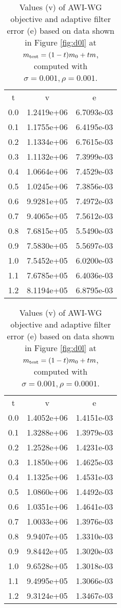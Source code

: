   \begin{table}
  \begin{center}
  \begin{tabular}{c|c|c}
    \hline
    t & v & e \\
0.0 & 1.2419e+06 & 6.7093e-03 \\
0.1 & 1.1755e+06 & 6.4195e-03 \\
0.2 & 1.1334e+06 & 6.7615e-03 \\
0.3 & 1.1132e+06 & 7.3999e-03 \\
0.4 & 1.0664e+06 & 7.4529e-03 \\
0.5 & 1.0245e+06 & 7.3856e-03 \\
0.6 & 9.9281e+05 & 7.4972e-03 \\
0.7 & 9.4065e+05 & 7.5612e-03 \\
0.8 & 7.6815e+05 & 5.5490e-03 \\
0.9 & 7.5830e+05 & 5.5697e-03 \\
1.0 & 7.5452e+05 & 6.0200e-03 \\
1.1 & 7.6785e+05 & 6.4036e-03 \\
1.2 & 8.1194e+05 & 6.8795e-03 \\
    \hline 
  \end{tabular}
   \caption{Values (v) of AWI-WG objective and adaptive filter error (e) based on data shown in Figure \ref{fig:d0l} at $m_{\rm test} = (1-t)m_0 + t m$, computed with $\sigma=0.001, \rho = 0.001$.}
  \label{table:rho001}    
  \end{center}
\end{table}

\begin{table}
  \begin{center}
  \begin{tabular}{c|c|c}
    \hline
    t & v & e \\
0.0 & 1.4052e+06 & 1.4151e-03 \\
0.1 & 1.3288e+06 & 1.3979e-03 \\
0.2 & 1.2528e+06 & 1.4231e-03 \\
0.3 & 1.1850e+06 & 1.4625e-03 \\
0.4 & 1.1325e+06 & 1.4531e-03 \\
0.5 & 1.0860e+06 & 1.4492e-03 \\
0.6 & 1.0351e+06 & 1.4641e-03 \\
0.7 & 1.0033e+06 & 1.3976e-03 \\
0.8 & 9.9407e+05 & 1.3310e-03 \\
0.9 & 9.8442e+05 & 1.3020e-03 \\
1.0 & 9.6528e+05 & 1.3018e-03 \\
1.1 & 9.4995e+05 & 1.3066e-03 \\
    1.2 & 9.3124e+05 & 1.3467e-03 \\
        \hline 
  \end{tabular}
   \caption{Values (v) of AWI-WG objective and adaptive filter error (e) based on data shown in Figure \ref{fig:d0l} at $m_{\rm test} = (1-t)m_0 + t m$, computed with $\sigma=0.001, \rho = 0.0001$.}
    \label{table:rho0001}
  \end{center}
\end{table}
    
